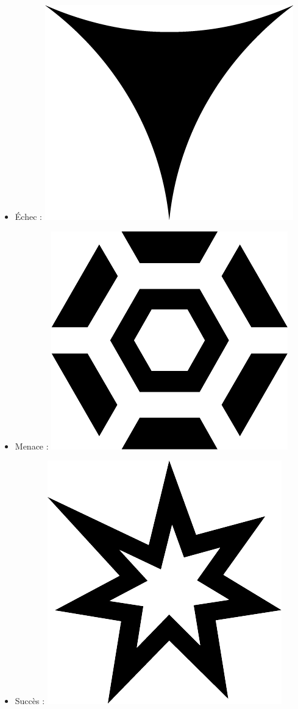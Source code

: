 \documentclass{article}
\begin{document}
\begin{multicols}{3}
\begin{itemize}
		\item Échec : {\Large \includegraphics[height=\fontcharht\font`\B]{../img/result_echec_failure}}
		\item Menace : {\Large \includegraphics[height=\fontcharht\font`\B]{../img/result_menace_threat}}
		\item Succès : {\Large \includegraphics[height=\fontcharht\font`\B]{../img/result_succes_success}}

\end{itemize}
\end{multicols}
\end{document}
